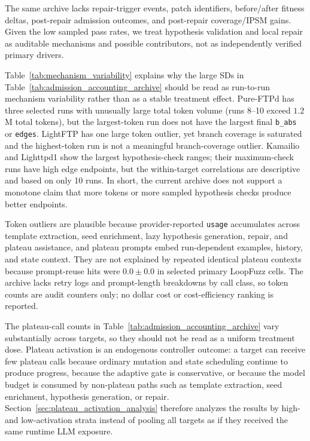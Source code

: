 \documentclass[final,5p,times,number]{elsarticle}
\begin{document}
The same archive lacks repair-trigger events, patch identifiers, before/after fitness deltas, post-repair admission outcomes, and post-repair coverage/IPSM gains. Given the low sampled pass rates, we treat hypothesis validation and local repair as auditable mechanisms and possible contributors, not as independently verified primary drivers.

Table~\ref{tab:mechanism_variability} explains why the large SDs in Table~\ref{tab:admission_accounting_archive} should be read as run-to-run mechanism variability rather than as a stable treatment effect. Pure-FTPd has three selected runs with unusually large total token volume (runs 8--10 exceed $1.2$M total tokens), but the largest-token run does not have the largest final \texttt{b\_abs} or \texttt{edges}. LightFTP has one large token outlier, yet branch coverage is saturated and the highest-token run is not a meaningful branch-coverage outlier. Kamailio and Lighttpd1 show the largest hypothesis-check ranges; their maximum-check runs have high edge endpoints, but the within-target correlations are descriptive and based on only 10 runs. In short, the current archive does not support a monotone claim that more tokens or more sampled hypothesis checks produce better endpoints.

Token outliers are plausible because provider-reported \texttt{usage} accumulates across template extraction, seed enrichment, lazy hypothesis generation, repair, and plateau assistance, and plateau prompts embed run-dependent examples, history, and state context. They are not explained by repeated identical plateau contexts because prompt-reuse hits were $0.0{\pm}0.0$ in selected primary LoopFuzz cells. The archive lacks retry logs and prompt-length breakdowns by call class, so token counts are audit counters only; no dollar cost or cost-efficiency ranking is reported.

The plateau-call counts in Table~\ref{tab:admission_accounting_archive} vary substantially across targets, so they should not be read as a uniform treatment dose. Plateau activation is an endogenous controller outcome: a target can receive few plateau calls because ordinary mutation and state scheduling continue to produce progress, because the adaptive gate is conservative, or because the model budget is consumed by non-plateau paths such as template extraction, seed enrichment, hypothesis generation, or repair. Section~\ref{sec:plateau_activation_analysis} therefore analyzes the results by high- and low-activation strata instead of pooling all targets as if they received the same runtime LLM exposure.
\end{document}

